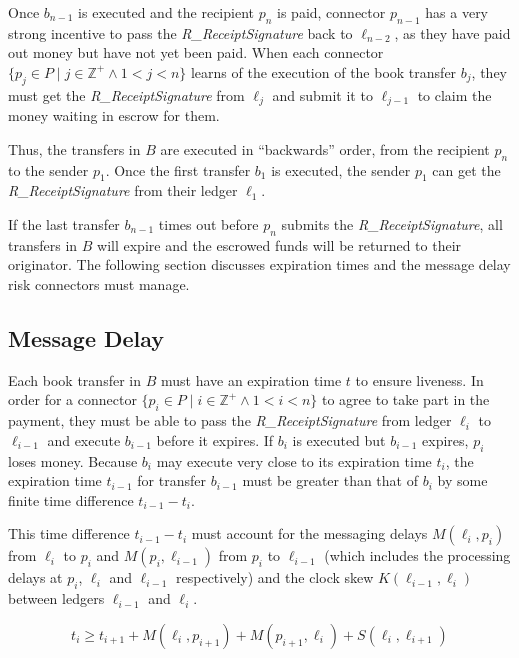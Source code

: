 \documentclass[letterpaper,twocolumn,10pt]{article}
\begin{document}
Once $b_{n-1}$ is executed and the recipient $p_n$ is paid, connector $p_{n-1}$ has a very strong incentive to pass the \textit{R\_ReceiptSignature} back to $\ell_{n-2}$, as they have paid out money but have not yet been paid. When each connector $ \{ p_j \in P \mid j \in \mathbb{Z}^+ \land 1 < j < n \} $ learns of the execution of the book transfer $b_j$, they must get the \textit{R\_ReceiptSignature} from $\ell_j$ and submit it to $\ell_{j-1}$ to claim the money waiting in escrow for them. 

Thus, the transfers in $B$ are executed in ``backwards'' order, from the recipient $p_n$ to the sender $p_1$. Once the first transfer $b_1$ is executed, the sender $p_1$ can get the \textit{R\_ReceiptSignature} from their ledger $\ell_1$.

If the last transfer $b_{n-1}$ times out before $p_n$ submits the \textit{R\_ReceiptSignature}, all transfers in $B$ will expire and the escrowed funds will be returned to their originator. The following section discusses expiration times and the message delay risk connectors must manage.


\subsection{Message Delay}
\label{subsec:message-delay}

Each book transfer in $B$ must have an expiration time $t$ to ensure liveness. In order for a connector $ \{ p_i \in P \mid i \in \mathbb{Z}^+ \land 1 < i < n \} $ to agree to take part in the payment, they must be able to pass the \textit{R\_ReceiptSignature} from ledger $\ell_i$ to $\ell_{i-1}$ and execute $b_{i-1}$ before it expires. If $b_i$ is executed but $b_{i-1}$ expires, $p_i$ loses money. Because $b_i$ may execute very close to its expiration time $t_i$, the expiration time $t_{i-1}$ for transfer $b_{i-1}$ must be greater than that of $b_i$ by some finite time difference $t_{i-1} - t_i$.

This time difference $t_{i-1} - t_i$ must account for the messaging delays $M(\ell_i, p_i)$ from $\ell_i$ to $p_i$ and $M(p_i, \ell_{i-1})$ from $p_i$ to $\ell_{i-1}$ (which includes the processing delays at $p_i$, $\ell_i$ and $\ell_{i-1}$ respectively) and the clock skew $K(\ell_{i-1}, \ell_i)$ between ledgers $\ell_{i-1}$ and $\ell_i$.

\begin{equation}
\label{eq:expiration-delta}
t_i \geq t_{i+1} + M(\ell_i, p_{i+1}) + M(p_{i+1}, \ell_i) + S(\ell_i, \ell_{i+1})
\end{equation}
\end{document}
